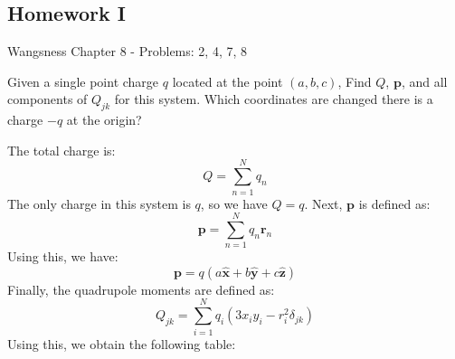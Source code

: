 \documentclass[crop=false,class=book,oneside]{standalone}
\begin{document}
        \subsection{Homework I}
            Wangsness Chapter 8 - Problems: 2, 4, 7, 8
            \begin{problem}
                \label{problem:EMAG_II_Wangsnes_8_2}
                Given a single point charge $q$ located at the
                point $(a,b,c)$, Find $Q$, $\mathbf{p}$, and
                all components of $Q_{jk}$ for this system. Which
                coordinates are changed there is a charge $\minus{q}$
                at the origin?
            \end{problem}
            \begin{solution}
                The total charge is:
                \begin{equation}
                    Q=\sum_{n=1}^{N}q_{n}
                \end{equation}
                The only charge in this system is $q$, so we have
                $Q=q$. Next, $\mathbf{p}$ is defined as:
                \begin{equation}
                    \mathbf{p}=
                    \sum_{n=1}^{N}q_{n}\mathbf{r}_{n}
                \end{equation}
                Using this, we have:
                \begin{equation}
                    \mathbf{p}=
                    q(a\hat{\mathbf{x}}+b\hat{\mathbf{y}}+c\hat{\mathbf{z}})
                \end{equation}
                Finally, the quadrupole moments are defined as:
                \begin{equation}
                    Q_{jk}=
                    \sum_{i=1}^{N}q_{i}(3x_{i}y_{i}-r^{2}_{i}\delta_{jk})
                \end{equation}
                Using this, we obtain the following table:
                \begin{table}[H]
                    \centering
                    \captionsetup{type=table}
\end{table}
\end{solution}
\end{document}
